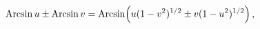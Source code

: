 \[\mathop{\mathrm{Arcsin}\/}\nolimits u\pm\mathop{\mathrm{Arcsin}\/}\nolimits v=%
\mathop{\mathrm{Arcsin}\/}\nolimits\!\left(u(1-v^{2})^{1/2}\pm v(1-u^{2})^{1/2%
}\right),\]